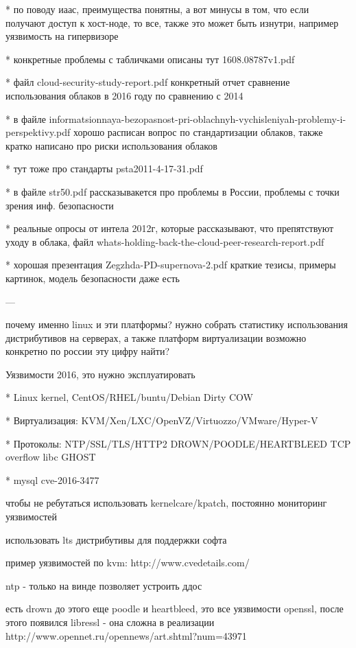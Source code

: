 * по поводу иаас, преимущества понятны, а вот минусы в том, что если получают доступ к хост-ноде, то все, также это может быть изнутри, например уязвимость на гипервизоре

* конкретные проблемы с табличками описаны тут 1608.08787v1.pdf

* файл cloud-security-study-report.pdf конкретный отчет сравнение использования облаков в 2016 году по сравнению с 2014

* в файле informatsionnaya-bezopasnost-pri-oblachnyh-vychisleniyah-problemy-i-perspektivy.pdf хорошо расписан вопрос по стандартизации облаков, также кратко написано про риски использования облаков

* тут тоже про стандарты psta2011-4-17-31.pdf

* в файле str50.pdf рассказывакется про проблемы в России, проблемы с точки зрения инф. безопасности

* реальные опросы от интела 2012г, которые рассказывают, что препятствуют уходу в облака, файл whats-holding-back-the-cloud-peer-research-report.pdf

* хорошая презентация Zegzhda-PD-supernova-2.pdf краткие тезисы, примеры картинок, модель безопасности даже есть

---

почему именно linux и эти платформы?
нужно собрать статистику использования дистрибутивов на серверах, а также платформ виртуализации
возможно конкретно по россии эту цифру найти?

Уязвимости 2016, это нужно эксплуатировать

* Linux kernel, CentOS/RHEL/buntu/Debian Dirty COW

* Виртуализация: KVM/Xen/LXC/OpenVZ/Virtuozzo/VMware/Hyper-V

* Протоколы: NTP/SSL/TLS/HTTP2 DROWN/POODLE/HEARTBLEED TCP overflow libc GHOST

* mysql cve-2016-3477

чтобы не ребутаться использовать kernelcare/kpatch, постоянно мониторинг уязвимостей

использовать lts дистрибутивы для поддержки софта

пример уязвимостей по kvm: http://www.cvedetails.com/

ntp - только на винде позволяет устроить ддос

есть drown до этого еще poodle и heartbleed, это все уязвимости openssl, после этого появился libressl - она сложна в реализации http://www.opennet.ru/opennews/art.shtml?num=43971

